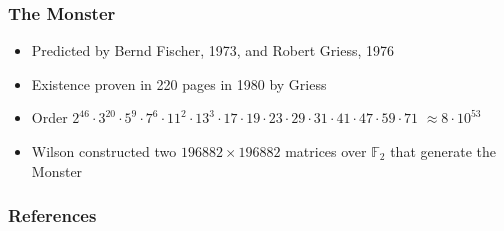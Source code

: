 \documentclass{beamer}
\begin{document}
\begin{frame}
	\frametitle{The Monster}
	\begin{itemize}
		\item
		Predicted by Bernd Fischer, 1973, and Robert Griess, 1976
		\item
		Existence proven in 220 pages in 1980 by Griess
		\item
		Order $2^{46} \cdot 3^{20}\cdot 5^9 \cdot 7^6 \cdot 11^2 \cdot 13^3 \cdot 17 \cdot 19 \cdot 23 \cdot 29 \cdot 31 \cdot 41 \cdot 47 \cdot 59 \cdot 71$ $\approx 8 \cdot 10^{53}$
		\item
		Wilson constructed two $196882 \times 196882$ matrices over $\mathbb{F}_2$ that generate the Monster
	\end{itemize}
\end{frame}

\begin{frame}
	\frametitle{References}
	
	
\end{frame}
\end{document}
